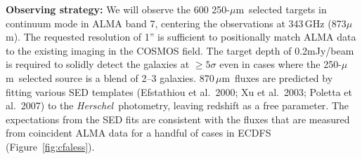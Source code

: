 \documentclass[12pt,a4paper]{article}
\newcommand{\herschel}{{\it Herschel}}
\newcommand{\micron}{$\mu$m}
\begin{document}
\vspace{0.2cm}
{\bf Observing strategy:}
%
We will observe the 600 250-\micron\ selected targets in continuum
mode in ALMA band 7, centering the observations at 343\,GHz
(873\micron). 
%
The requested resolution of 1'' is sufficient to positionally match
ALMA data to the existing imaging in the COSMOS field. The target depth of 0.2mJy/beam
is required to solidly detect the galaxies at $\ge5\sigma$ even in
cases where the 250-\micron\ selected source is a blend of 2--3
galaxies. 870\,\micron\ fluxes are predicted by fitting various SED
templates (Efstathiou et al.\ 2000; Xu et al.\
2003; Poletta et al.\ 2007) to the \herschel\ photometry, leaving
redshift as a free parameter. The expectations from the SED fits are
consistent with the fluxes that are measured from coincident ALMA data for a handful of cases
in ECDFS (Figure~\ref{fig:cfaless}).



\end{document}
